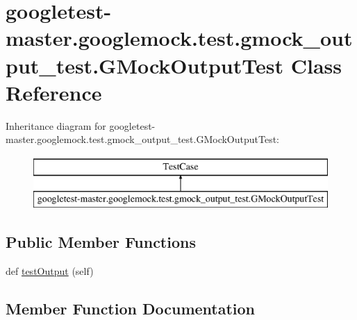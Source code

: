 \hypertarget{classgoogletest-master_1_1googlemock_1_1test_1_1gmock__output__test_1_1_g_mock_output_test}{}\section{googletest-\/master.googlemock.\+test.\+gmock\+\_\+output\+\_\+test.\+G\+Mock\+Output\+Test Class Reference}
\label{classgoogletest-master_1_1googlemock_1_1test_1_1gmock__output__test_1_1_g_mock_output_test}
Inheritance diagram for googletest-\/master.googlemock.\+test.\+gmock\+\_\+output\+\_\+test.\+G\+Mock\+Output\+Test\+:\begin{figure}[H]
\begin{center}
\leavevmode
\includegraphics[height=2.000000cm]{d4/dcb/classgoogletest-master_1_1googlemock_1_1test_1_1gmock__output__test_1_1_g_mock_output_test}
\end{center}
\end{figure}
\subsection*{Public Member Functions}
\begin{DoxyCompactItemize}
\item 
def \mbox{\hyperlink{classgoogletest-master_1_1googlemock_1_1test_1_1gmock__output__test_1_1_g_mock_output_test_ace5c97acc22e6f2bb488ff5854a64c59}{test\+Output}} (self)
\end{DoxyCompactItemize}


\subsection{Member Function Documentation}
\mbox{\label{classgoogletest-master_1_1googlemock_1_1test_1_1gmock__output__test_1_1_g_mock_output_test_ace5c97acc22e6f2bb488ff5854a64c59}} 
